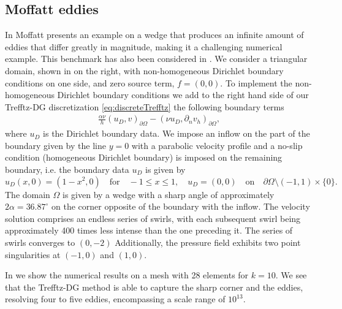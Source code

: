 \documentclass[pdflatex,sn-mathphys,Numbered]{sn-jnl}%
\theoremstyle{remark}%
\theoremstyle{definition}%
\begin{document}
\subsection{Moffatt eddies}
In \cite{moffatt_1964} Moffatt presents an example on a wedge that
produces an infinite amount of eddies that differ greatly in
magnitude, making it a challenging numerical example. This benchmark
has also been considered in \cite{ainsworthparker}.
We consider a triangular domain, shown in  on the right, with non-homogeneous Dirichlet boundary conditions on one side, and zero source term, $f=(0,0)$.
To implement the non-homogeneous Dirichlet boundary conditions we add to the right hand side of our Trefftz-DG discretization \eqref{eq:discreteTrefftz} the following boundary terms
\begin{align*}
    \frac{\alpha\nu}{h} (u_D, v)_{\partial\Omega} - (\nu u_D, \partial_n v_h)_{\partial\Omega},
\end{align*}
where $u_D$ is the Dirichlet boundary data.
We impose an inflow on the part of the boundary given by the line $y=0$ with a
parabolic velocity profile and a no-slip condition (homogeneous Dirichlet boundary) is imposed on the
remaining boundary, i.e. the boundary data $u_D$ is given by
\begin{equation*}
    u_D(x,0)=
      (1-x^2,0)
        \quad \text{for} \quad -1\leq x\leq 1,\quad
        u_D=(0,0)\quad\text{on}\quad \partial\Omega\setminus (-1,1)\times\{0\}.
\end{equation*}
The domain
$\Omega$ is given by a wedge with a sharp angle of approximately
$2\alpha=36.87^\circ$ on the corner opposite of the boundary with the
inflow. 
The velocity solution comprises an endless series of swirls, with each subsequent swirl being approximately 400 times less intense than the one preceding it.
The series of swirls converges to $(0,-2)$
Additionally, the pressure field exhibits two point singularities at $(-1,0)$ and $(1,0)$.

In  we show the numerical results on a mesh with 28 elements for $k=10$.
We see that the Trefftz-DG method is able to capture the sharp corner and the eddies, resolving four to five eddies, encompassing a scale range of $10^{13}$.
\end{document}
